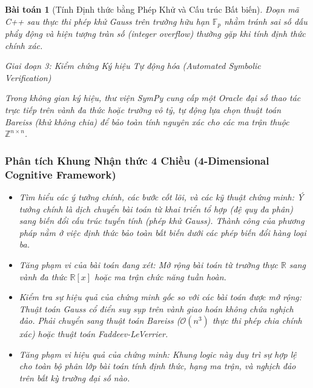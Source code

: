 \documentclass{article}
\newtheorem{baitoan}{Bài toán}
\begin{document}
\begin{baitoan}[Tính Định thức bằng Phép Khử và Cấu trúc Bất biến]
 Đoạn mã C++ sau thực thi phép khử Gauss trên trường hữu hạn $\mathbb{F}_p$ nhằm tránh sai số dấu phẩy động và hiện tượng tràn số (integer overflow) thường gặp khi tính định thức chính xác.



\vspace{0.5em}\noindent\emph{Giai đoạn 3: Kiểm chứng Ký hiệu Tự động hóa (Automated Symbolic Verification)}
 
 Trong không gian ký hiệu, thư viện SymPy cung cấp một \textit{Oracle đại số} thao tác trực tiếp trên vành đa thức hoặc trường vô tỷ, tự động lựa chọn thuật toán Bareiss (khử không chia) để bảo toàn tính nguyên xác cho các ma trận thuộc $\mathbb{Z}^{n \times n}$.



 \subsubsection*{Phân tích Khung Nhận thức 4 Chiều (4-Dimensional Cognitive Framework)}
 \begin{itemize}
 \item \textit{Tìm hiểu các ý tưởng chính, các bước cốt lõi, và các kỹ thuật chứng minh}: Ý tưởng chính là dịch chuyển bài toán từ khai triển tổ hợp (đệ quy đa phân) sang biến đổi cấu trúc tuyến tính (phép khử Gauss). Thành công của phương pháp nằm ở việc định thức bảo toàn bất biến dưới các phép biến đổi hàng loại ba.
 \item \textit{Tăng phạm vi của bài toán đang xét}: Mở rộng bài toán từ trường thực $\mathbb{R}$ sang vành đa thức $\mathbb{R}[x]$ hoặc ma trận chức năng tuần hoàn.
 \item \textit{Kiểm tra sự hiệu quả của chứng minh gốc so với các bài toán được mở rộng}: Thuật toán Gauss cổ điển suy sụp trên vành giao hoán không chứa nghịch đảo. Phải chuyển sang thuật toán Bareiss ($\mathcal{O}(n^3)$ thực thi phép chia chính xác) hoặc thuật toán Faddeev-LeVerrier.
 \item \textit{Tăng phạm vi hiệu quả của chứng minh}: Khung logic này duy trì sự hợp lệ cho toàn bộ phân lớp bài toán tính định thức, hạng ma trận, và nghịch đảo trên bất kỳ trường đại số nào.
 \end{itemize}
\end{baitoan}
\end{document}
